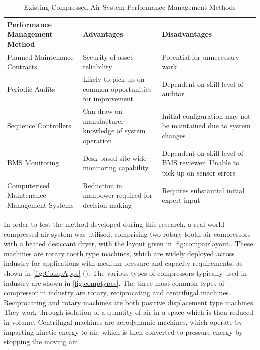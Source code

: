 \begin{table}
  \centering
  \caption{Existing Compressed Air System Performance Management Methods}
    \begin{tabular}{p{.3\linewidth}|p{.3\linewidth}|p{.3\linewidth}}
    \toprule
    Performance Management Method & Advantages & Disadvantages \\
    \toprule
    Planned Maintenance Contracts & Security of asset reliability & Potential for unnecessary work \\
    \midrule
    Periodic Audits & Likely to pick up on common opportunities for improvement & Dependent on skill level of auditor \\
    \midrule
    Sequence Controllers & Can draw on manufacturer knowledge of system operation & Initial configuration may not be maintained due to system changes \\
    \midrule
    BMS Monitoring & Desk-based site wide monitoring capability & Dependent on skill level of BMS reviewer. Unable to pick up on sensor errors \\
    \midrule
    Computerised Maintenance Management Systems & Reduction in manpower required for decision-making & Requires substantial initial expert input\\
    \bottomrule
    \end{tabular}%
  \label{tab:perfmgmt}%
\end{table}%


In order to test the method developed during this research, a real world compressed air system was utilised, comprising two rotary tooth air compressors with a heated desiccant dryer, with the layout given in \autoref{fig:compairlayout}. These machines are rotary tooth type machines, which are widely deployed across industry for applications with medium pressure and capacity requirements, as shown in \autoref{fig:CompApps} (\cite{SEAI2007}). The various types of compressors typically used in industry are shown in \autoref{fig:comptypes}. The three most common types of compressor in industry are rotary, reciprocating and centrifugal machines. Reciprocating and rotary machines are both positive displacement type machines. They work through isolation of a quantity of air in a space which is then reduced in volume. Centrifugal machines are aerodynamic machines, which operate by imparting kinetic energy to air, which is then converted to pressure energy by stopping the moving air.

